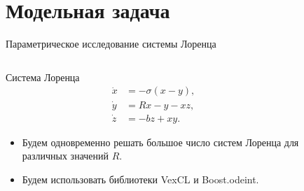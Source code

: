 \documentclass[@BEAMER_OPTIONS@]{beamer}
\begin{document}
\section{Модельная задача}

\begin{frame}{}
    \tableofcontents[currentsection]
\end{frame}

\note{
}

\begin{frame}[fragile]{Параметрическое исследование системы Лоренца}
    \begin{columns}
        \begin{column}{0.6\textwidth}
            \begin{block}{Система Лоренца}
                \vspace{-1\baselineskip}
                \begin{align*}
                    \dot{x} &= -\sigma \left( x - y \right), \\
                    \dot{y} &= R x - y - xz, \\
                    \dot{z} &= -bz + xy.
                    \label{eq:lorenz}
                \end{align*}
            \end{block}
            \begin{itemize}
                \item Будем одновременно решать большое число систем Лоренца
                    для различных значений $R$.
                \item Будем использовать библиотеки VexCL и Boost.odeint.
            \end{itemize}
        \end{column}
        \begin{column}{0.4\textwidth}
            \begin{figure}

\end{figure}
\end{column}
\end{columns}
\end{frame}
\end{document}

